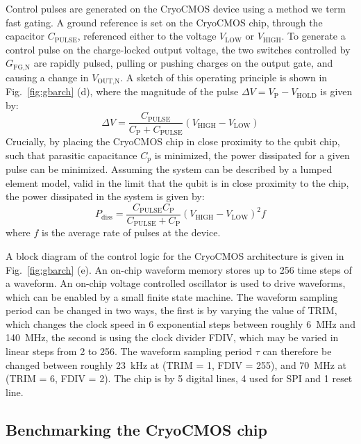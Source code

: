 Control pulses are generated on the CryoCMOS device using a method we term fast gating. A ground reference is set on the CryoCMOS chip, through the capacitor $C_\textrm{PULSE}$, referenced
either to the voltage $V_\textrm{LOW}$ or $V_\textrm{HIGH}$. To generate a control pulse on the charge-locked output voltage, the two switches controlled by $G_\textrm{FG,N}$ are rapidly pulsed,
pulling or pushing charges on the output gate, and causing a change in $V_\textrm{OUT,N}$. A sketch of this operating principle is shown in Fig.~\ref{fig:gbarch} (d), where the magnitude of the
pulse $\Delta V = V_\textrm{P} - V_\textrm{HOLD}$ is given by:
\begin{equation}
  \Delta V = \frac{C_\textrm{PULSE}}{C_\textrm{P} + C_\textrm{PULSE}} (V_\textrm{HIGH} - V_\textrm{LOW})
\end{equation}
Crucially, by placing the CryoCMOS chip in close proximity to the qubit chip, such that parasitic capacitance $C_p$ is minimized, the power dissipated for a given pulse can be minimized.
Assuming the system can be described by a lumped element model, valid in the limit that the qubit is in close proximity to the chip, the power dissipated in the system is given by:
\begin{equation}
  P_\textrm{diss} = \frac{C_\textrm{PULSE}C_\textrm{P}}{C_\textrm{PULSE} + C_\textrm{P}} \left(V_\textrm{HIGH} - V_\textrm{LOW}\right)^2 f
\end{equation}
where $f$ is the average rate of pulses at the device.

A block diagram of the control logic for the CryoCMOS architecture is given in Fig.~\ref{fig:gbarch} (e). An on-chip waveform memory stores up to 256 time steps of a waveform. An
on-chip voltage controlled oscillator is used to drive waveforms, which can be enabled by a small finite state machine. The waveform sampling period can be changed in two ways,
the first is by varying the value of TRIM, which changes the clock speed in 6 exponential steps between roughly \SI{6}{\mega\hertz} and \SI{140}{\mega\hertz}, the second is using
the clock divider FDIV, which may be varied in linear steps from 2 to 256. The waveform sampling period $\tau$ can therefore be changed between roughly \SI{23}{\kilo\hertz} at
(TRIM = 1, FDIV = 255), and \SI{70}{\mega\hertz} at (TRIM = 6, FDIV = 2). The chip is by 5 digital lines, 4 used for SPI and 1 reset line.

\subsection{Benchmarking the CryoCMOS chip}

